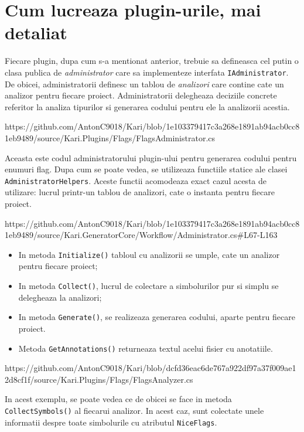 \documentclass{report}
\begin{document}
\section{Cum lucreaza plugin-urile, mai detaliat}

Fiecare plugin, dupa cum s-a mentionat anterior, trebuie sa defineasca
cel putin o clasa publica de \emph{administrator} care sa implementeze
interfata \texttt{IAdministrator}. De obicei, administratorii definesc
un tablou de \emph{analizori} care contine cate un analizor pentru
fiecare proiect. Administratorii delegheaza deciziile concrete referitor
la analiza tipurilor si generarea codului pentru ele la analizorii
acestia.

https://github.com/AntonC9018/Kari/blob/1e103379417c3a268e1891ab94acb0cc81eb9489/source/Kari.Plugins/Flags/FlagsAdministrator.cs

Aceasta este codul administratorului plugin-ului pentru generarea
codului pentru enumuri flag. Dupa cum se poate vedea, se utilizeaza
functiile statice ale clasei \texttt{AdministratorHelpers}. Aceste
functii acomodeaza exact cazul acesta de utilizare: lucrul printr-un
tablou de analizori, cate o instanta pentru fiecare proiect.

https://github.com/AntonC9018/Kari/blob/1e103379417c3a268e1891ab94acb0cc81eb9489/source/Kari.GeneratorCore/Workflow/Administrator.cs\#L67-L163

\begin{itemize}
\item
  In metoda \texttt{Initialize()} tabloul cu analizorii se umple, cate
  un analizor pentru fiecare proiect;
\item
  In metoda \texttt{Collect()}, lucrul de colectare a simbolurilor pur
  si simplu se delegheaza la analizori;
\item
  In metoda \texttt{Generate()}, se realizeaza generarea codului, aparte
  pentru fiecare proiect.
\item
  Metoda \texttt{GetAnnotations()} returneaza textul acelui fisier cu
  anotatiile.
\end{itemize}

https://github.com/AntonC9018/Kari/blob/dcfd36eac6de767a922df97a37f009ae12d8cf1f/source/Kari.Plugins/Flags/FlagsAnalyzer.cs

In acest exemplu, se poate vedea ce de obicei se face in metoda
\texttt{CollectSymbols()} al fiecarui analizor. In acest caz, sunt
colectate unele informatii despre toate simbolurile cu atributul
\texttt{NiceFlags}.
\end{document}
